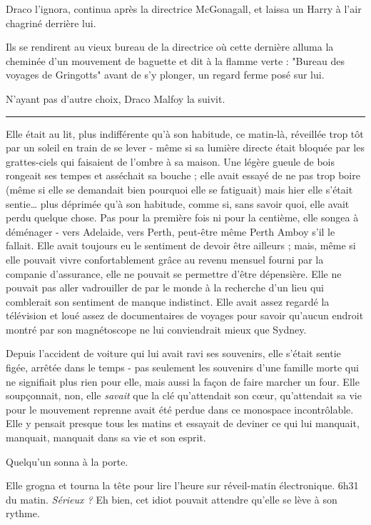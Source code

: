 Draco l'ignora, continua après la directrice McGonagall, et laissa un Harry à l'air chagriné derrière lui.

Ils se rendirent au vieux bureau de la directrice où cette dernière alluma la cheminée d'un mouvement de baguette et dit à la flamme verte : "Bureau des voyages de Gringotts" avant de s'y plonger, un regard ferme posé sur lui.

N'ayant pas d'autre choix, Draco Malfoy la suivit.
\par\noindent\rule{\textwidth}{0.4pt}
Elle était au lit, plus indifférente qu'à son habitude, ce matin-là, réveillée trop tôt par un soleil en train de se lever - même si sa lumière directe était bloquée par les grattes-ciels qui faisaient de l'ombre à sa maison. Une légère gueule de bois rongeait ses tempes et asséchait sa bouche ; elle avait essayé de ne pas trop boire (même si elle se demandait bien pourquoi elle se fatiguait) mais hier elle s'était sentie… plus déprimée qu'à son habitude, comme si, sans savoir quoi, elle avait perdu quelque chose. Pas pour la première fois ni pour la centième, elle songea à déménager - vers Adelaide, vers Perth, peut-être même Perth Amboy s'il le fallait. Elle avait toujours eu le sentiment de devoir être ailleurs ; mais, même si elle pouvait vivre confortablement grâce au revenu mensuel fourni par la companie d'assurance, elle ne pouvait se permettre d'être dépensière. Elle ne pouvait pas aller vadrouiller de par le monde à la recherche d'un lieu qui comblerait son sentiment de manque indistinct. Elle avait assez regardé la télévision et loué assez de documentaires de voyages pour savoir qu'aucun endroit montré par son magnétoscope ne lui conviendrait mieux que Sydney.

Depuis l'accident de voiture qui lui avait ravi ses souvenirs, elle s'était sentie figée, arrêtée dans le temps - pas seulement les souvenirs d'une famille morte qui ne signifiait plus rien pour elle, mais aussi la façon de faire marcher un four. Elle soupçonnait, non, elle \emph{savait}  que la clé qu'attendait son cœur, qu'attendait sa vie pour le mouvement reprenne avait été perdue dans ce monospace incontrôlable. Elle y pensait presque tous les matins et essayait de deviner ce qui lui manquait, manquait, manquait dans sa vie et son esprit.

Quelqu'un sonna à la porte.

Elle grogna et tourna la tête pour lire l'heure sur réveil-matin électronique. 6h31 du matin. \emph{Sérieux ?}  Eh bien, cet idiot pouvait attendre qu'elle se lève à son rythme.


